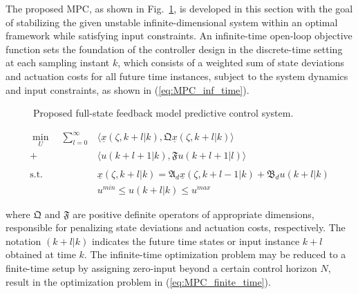 The proposed MPC, as shown in Fig.~\ref{fig:block_diagram}, is developed in this section with the goal of stabilizing the given unstable infinite-dimensional system within an optimal framework while satisfying input constraints. An infinite-time open-loop objective function sets the foundation of the controller design in the discrete-time setting at each sampling instant $k$, which consists of a weighted sum of state deviations and actuation costs for all future time instances, subject to the system dynamics and input constraints, as shown in (\ref{eq:MPC_inf_time}).

\begin{figure}[!htbp]
    \centering
    \caption{Proposed full-state feedback model predictive control system.}
    \label{fig:block_diagram}
\end{figure}

\begin{equation} \label{eq:MPC_inf_time}
    \begin{aligned}
        \min_{U} \quad \sum_{l=0}^{\infty} &\langle \underline{x}(\zeta, k+l | k), \mathfrak{Q} \underline{x}(\zeta, k+l | k) \rangle \\
        + &\langle u(k+l+1 | k), \mathfrak{F} u(k+l+1|l) \rangle \\
        \, \\
        \text{s.t.} \quad &\underline{x}(\zeta, k+l | k) = \mathfrak{A}_d \underline{x}(\zeta, k+l-1 | k) + \mathfrak{B}_d u(k+l | k) \\
        &u^{min} \leq u(k+l | k) \leq u^{max}
    \end{aligned}
\end{equation}

where $\mathfrak{Q}$ and $\mathfrak{F}$ are positive definite operators of appropriate dimensions, responsible for penalizing state deviations and actuation costs, respectively. The notation $(k+l|k)$ indicates the future time states or input instance $k+l$ obtained at time $k$. The infinite-time optimization problem may be reduced to a finite-time setup by assigning zero-input beyond a certain control horizon $N$, result in the optimization problem in (\ref{eq:MPC_finite_time}).

